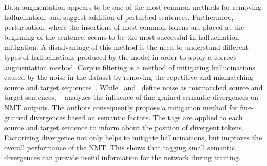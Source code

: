 Data augmentation appears to be one of the most common methods for removing hallucination.  and  suggest addition of perturbed sentences. Furthermore, perturbation, where the insertions of most common tokens are placed at the beginning of the sentence, seems to be the most successful in hallucination mitigation. A disadvantage of this method is the need to understand different types of hallucinations produced by the model in order to apply a correct augmentation method.
Corpus filtering is a method of mitigating hallucinations caused by the noise in the dataset by removing the repetitive and mismatching source and target sequences~. 
While~ and~ define noise as mismatched source and target sentences, ~ analyzes the influence of fine-grained semantic divergences on NMT outputs. The authors consequently propose a mitigation method for fine-grained divergences based on semantic factors. The tags are applied to each source and target sentence to inform about the position of divergent tokens. Factorizing divergence not only helps to mitigate hallucinations, but improves the overall performance of the NMT. This shows that tagging small semantic divergences can provide useful information for the network during training.

